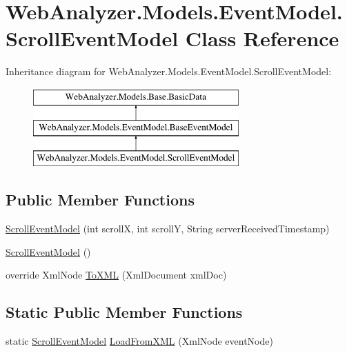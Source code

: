 \hypertarget{class_web_analyzer_1_1_models_1_1_event_model_1_1_scroll_event_model}{}\section{Web\+Analyzer.\+Models.\+Event\+Model.\+Scroll\+Event\+Model Class Reference}
\label{class_web_analyzer_1_1_models_1_1_event_model_1_1_scroll_event_model}
Inheritance diagram for Web\+Analyzer.\+Models.\+Event\+Model.\+Scroll\+Event\+Model\+:\begin{figure}[H]
\begin{center}
\leavevmode
\includegraphics[height=3.000000cm]{class_web_analyzer_1_1_models_1_1_event_model_1_1_scroll_event_model}
\end{center}
\end{figure}
\subsection*{Public Member Functions}
\begin{DoxyCompactItemize}
\item 
\hyperlink{class_web_analyzer_1_1_models_1_1_event_model_1_1_scroll_event_model_a3838b54daf2a7553722fb03bca9b69dc}{Scroll\+Event\+Model} (int scroll\+X, int scroll\+Y, String server\+Received\+Timestamp)
\item 
\hyperlink{class_web_analyzer_1_1_models_1_1_event_model_1_1_scroll_event_model_af4f8c38ef631eca3764a8c9a64d3ed0b}{Scroll\+Event\+Model} ()
\item 
override Xml\+Node \hyperlink{class_web_analyzer_1_1_models_1_1_event_model_1_1_scroll_event_model_a31a31878863b84ba68338278f0624c9f}{To\+X\+M\+L} (Xml\+Document xml\+Doc)
\end{DoxyCompactItemize}
\subsection*{Static Public Member Functions}
\begin{DoxyCompactItemize}
\item 
static \hyperlink{class_web_analyzer_1_1_models_1_1_event_model_1_1_scroll_event_model}{Scroll\+Event\+Model} \hyperlink{class_web_analyzer_1_1_models_1_1_event_model_1_1_scroll_event_model_a1ab3066559cf15e8a145e3d38aecc4ab}{Load\+From\+X\+M\+L} (Xml\+Node event\+Node)
\end{DoxyCompactItemize}
